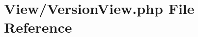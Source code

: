 \hypertarget{_version_view_8php}{}\section{View/\+Version\+View.php File Reference}
\label{_version_view_8php}
